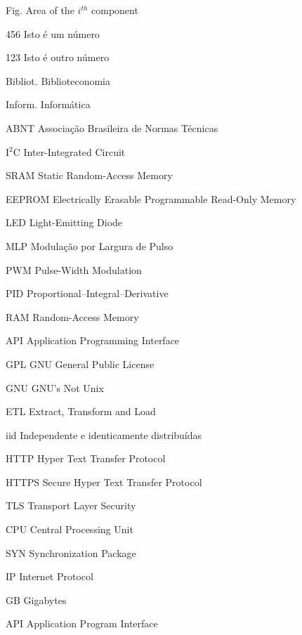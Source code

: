 \begin{siglas}
	\item[Fig.] Area of the $i^{th}$ component
	\item[456] Isto é um número
	\item[123] Isto é outro número
	\item [Bibliot.] Biblioteconomia
	\item [Inform.]  Informática
	\item [ABNT] Associação Brasileira de Normas Técnicas
	\item [I$^2$C] Inter-Integrated Circuit
	\item [SRAM] Static Random-Access Memory
	\item [EEPROM]	Electrically Erasable Programmable Read-Only Memory
	\item [LED] Light-Emitting Diode
	\item [MLP] Modulação por Largura de Pulso
	\item [PWM] Pulse-Width Modulation
	\item [PID] Proportional–Integral–Derivative
	\item [RAM] Random-Access Memory
	\item [API] Application Programming Interface
	\item [GPL] GNU General Public License
	\item [GNU] GNU's Not Unix
	\item [ETL] Extract, Transform and Load
	\item [iid] Independente e identicamente distribuídas
	\item [HTTP] Hyper Text Transfer Protocol
	\item [HTTPS] Secure Hyper Text Transfer Protocol
	\item [TLS] Transport Layer Security
	\item [CPU] Central Processing Unit
	\item [SYN] Synchronization Package
	\item [IP] Internet Protocol
	\item [GB] Gigabytes
	\item [API] Application Program Interface
\end{siglas}